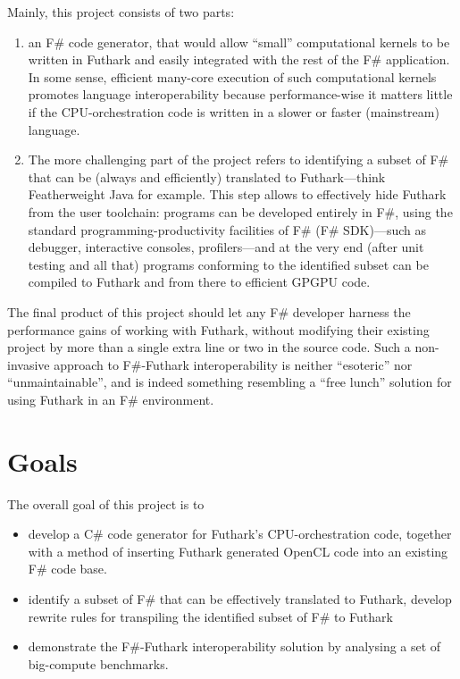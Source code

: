 \documentclass{article}
\newcommand{\fshark}[0]{\texttt{F\#thark}}
\begin{document}
Mainly, this project consists of two parts:
\begin{enumerate}
    \item an F\# code generator, that would allow ``small'' computational
        kernels to be written in Futhark and easily integrated with the
        rest of the F\# application. In some sense, efficient many-core
        execution of such computational kernels promotes language interoperability
        because performance-wise it matters little if the CPU-orchestration code
        is written in a slower or faster (mainstream) language.
    \item The more challenging part of the project refers to identifying
        a subset of F\# that can be (always and efficiently) translated to 
        Futhark---think Featherweight Java for example.
        This step allows to effectively hide Futhark from the user toolchain:
        programs can be developed entirely in F\#, using the standard 
        programming-productivity facilities of F\# (F\# SDK)---such as debugger,
        interactive consoles, profilers---and at the very end (after unit testing and all that)
        programs conforming to the identified subset can be compiled to Futhark
        and from there to efficient GPGPU code.
\end{enumerate}

The final product of this project should let any F\# developer harness the
performance gains of working with Futhark, without modifying their existing
project by more than a single extra line or two in the source code.
Such a non-invasive approach to F\#-Futhark interoperability is neither
``esoteric'' nor ``unmaintainable'', and is indeed something resembling a ``free
lunch'' solution for using Futhark in an F\# environment. 

\section{Goals}
The overall goal of this project is to
\begin{itemize}
    \item develop a C\# code generator for Futhark's CPU-orchestration code,
            together with a method of inserting Futhark generated OpenCL code into
            an existing F\# code base.

    \item identify a subset of F\# that can be effectively translated to Futhark,
            develop rewrite rules for transpiling the identified subset of F\# to 
            Futhark


    \item demonstrate the F\#-Futhark interoperability solution by analysing 
            a set of big-compute benchmarks.

\end{itemize}
\end{document}
